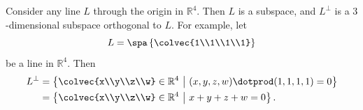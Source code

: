 \begin{example}
Consider any line \(L\) through the origin in \(\mathbb{R}^4\). Then \(L\) is a subspace, and \(L^\perp\) is a \(3\)-dimensional subspace orthogonal to \(L\). For example, let 
\[L=\spa \left\{ \colvec{1\\1\\1\\1} \right\}\] 
be a line in \(\mathbb{R}^4.\) Then 
\begin{align*}
L^\perp&=\left \{  \colvec{x\\y\\z\\w} \in \mathbb{R}^4 ~\middle| ~ (x,y,z,w) \dotprod (1,1,1,1)=0 \right\} \\
&=\left\{ \colvec{x\\y\\z\\w} \in \mathbb{R}^4 ~\middle| ~ x+y+z+w=0 \right \}.
\end{align*}


\end{example}
